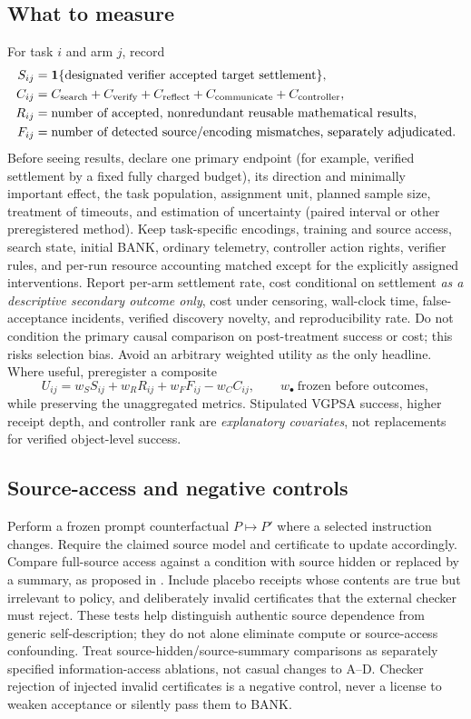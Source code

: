 \documentclass[11pt,letterpaper]{article}
\begin{document}
\subsection{What to measure}
For task $i$ and arm $j$, record
\begin{align*}
S_{ij}&=\mathbf 1\{\text{designated verifier accepted target settlement}\},\\
C_{ij}&=C_{\rm search}+C_{\rm verify}+C_{\rm reflect}+C_{\rm communicate}+C_{\rm controller},\\
R_{ij}&=\text{number of accepted, nonredundant reusable mathematical results},\\
F_{ij}&=\text{number of detected source/encoding mismatches, separately adjudicated}.
\end{align*}
Before seeing results, declare one primary endpoint (for example, verified settlement by a fixed fully charged budget), its direction and minimally important effect, the task population, assignment unit, planned sample size, treatment of timeouts, and estimation of uncertainty (paired interval or other preregistered method). Keep task-specific encodings, training and source access, search state, initial BANK, ordinary telemetry, controller action rights, verifier rules, and per-run resource accounting matched except for the explicitly assigned interventions. Report per-arm settlement rate, cost conditional on settlement \emph{as a descriptive secondary outcome only}, cost under censoring, wall-clock time, false-acceptance incidents, verified discovery novelty, and reproducibility rate. Do not condition the primary causal comparison on post-treatment success or cost; this risks selection bias. Avoid an arbitrary weighted utility as the only headline. Where useful, preregister a composite
\[
U_{ij}=w_S S_{ij}+w_RR_{ij}+w_FF_{ij}-w_CC_{ij},\qquad w_\bullet\ \text{frozen before outcomes},
\]
while preserving the unaggregated metrics. Stipulated VGPSA success, higher receipt depth, and controller rank are \emph{explanatory covariates}, not replacements for verified object-level success.

\subsection{Source-access and negative controls}
Perform a frozen prompt counterfactual $P\mapsto P'$ where a selected instruction changes. Require the claimed source model and certificate to update accordingly. Compare full-source access against a condition with source hidden or replaced by a summary, as proposed in \cite{vgpsa}. Include placebo receipts whose contents are true but irrelevant to policy, and deliberately invalid certificates that the external checker must reject. These tests help distinguish authentic source dependence from generic self-description; they do not alone eliminate compute or source-access confounding. Treat source-hidden/source-summary comparisons as separately specified information-access ablations, not casual changes to A--D. Checker rejection of injected invalid certificates is a negative control, never a license to weaken acceptance or silently pass them to BANK.
\end{document}
